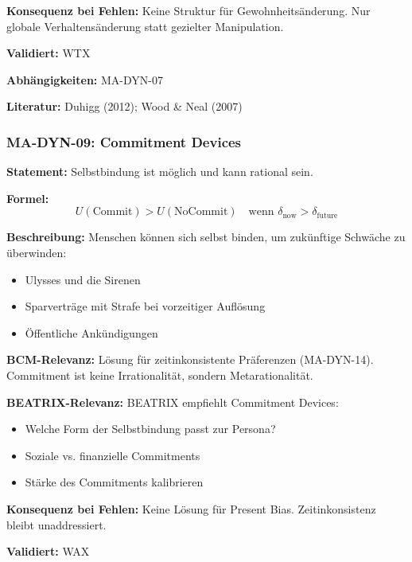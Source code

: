 \textbf{Konsequenz bei Fehlen:}
Keine Struktur für Gewohnheitsänderung. Nur globale Verhaltensänderung statt gezielter Manipulation.

\textbf{Validiert:} WTX

\textbf{Abhängigkeiten:} MA-DYN-07

\textbf{Literatur:} Duhigg (2012); Wood \& Neal (2007)


\subsubsection*{MA-DYN-09: Commitment Devices}

\textbf{Statement:} Selbstbindung ist möglich und kann rational sein.

\textbf{Formel:}
\begin{equation}
U(\text{Commit}) > U(\text{NoCommit}) \quad \text{wenn } \delta_{\text{now}} > \delta_{\text{future}}
\end{equation}

\textbf{Beschreibung:}
Menschen können sich selbst binden, um zukünftige Schwäche zu überwinden:
\begin{itemize}
    \item Ulysses und die Sirenen
    \item Sparverträge mit Strafe bei vorzeitiger Auflösung
    \item Öffentliche Ankündigungen
\end{itemize}

\textbf{BCM-Relevanz:}
Lösung für zeitinkonsistente Präferenzen (MA-DYN-14). Commitment ist keine Irrationalität, sondern Metarationalität.

\textbf{BEATRIX-Relevanz:}
BEATRIX empfiehlt Commitment Devices:
\begin{itemize}
    \item Welche Form der Selbstbindung passt zur Persona?
    \item Soziale vs. finanzielle Commitments
    \item Stärke des Commitments kalibrieren
\end{itemize}

\textbf{Konsequenz bei Fehlen:}
Keine Lösung für Present Bias. Zeitinkonsistenz bleibt unaddressiert.

\textbf{Validiert:} WAX

